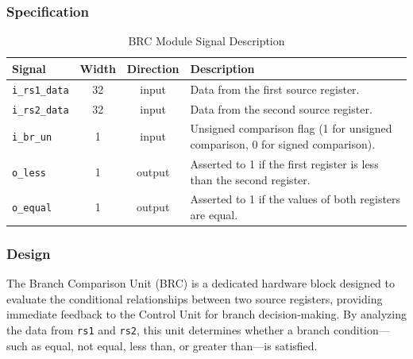 \subsubsection{Specification}
\begin{table}[h]
	\centering
	\begin{tabular}{l c c p{8cm}}
		\toprule
		\textbf{Signal} & \textbf{Width} & \textbf{Direction} & \textbf{Description} \\ \midrule
		\texttt{i\_rs1\_data} & 32 & input & Data from the first source register. \\ 
		\texttt{i\_rs2\_data} & 32 & input & Data from the second source register. \\ 
		\texttt{i\_br\_un} & 1 & input & Unsigned comparison flag (1 for unsigned comparison, 0 for signed comparison). \\ 
		\texttt{o\_less} & 1 & output & Asserted to 1 if the first register is less than the second register. \\ 
		\texttt{o\_equal} & 1 & output & Asserted to 1 if the values of both registers are equal. \\ 
		\bottomrule
	\end{tabular}
	\caption{BRC Module Signal Description}
	\label{tab:brc_spec}
\end{table}

\subsubsection{Design}

The Branch Comparison Unit (BRC) is a dedicated hardware block designed to evaluate the conditional relationships between two source registers, providing immediate feedback to the Control Unit for branch decision-making. By analyzing the data from \texttt{rs1} and \texttt{rs2}, this unit determines whether a branch condition—such as equal, not equal, less than, or greater than—is satisfied.

